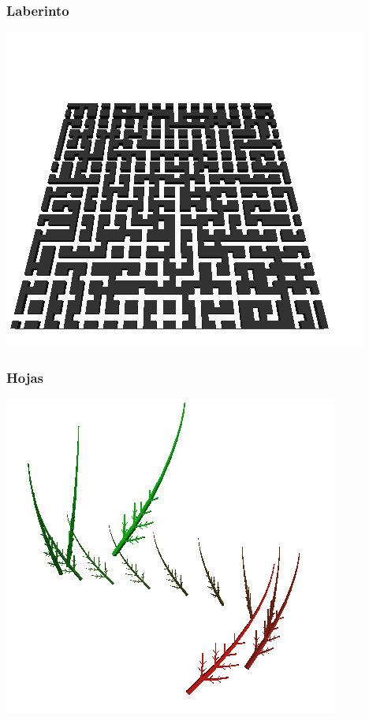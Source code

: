 \subsubsection{Laberinto}



\centerline{\includegraphics[scale=0.40]{../imagenes/eg25.png}}


\subsubsection{Hojas}



\centerline{\includegraphics[scale=0.40]{../imagenes/eg26.png}}


